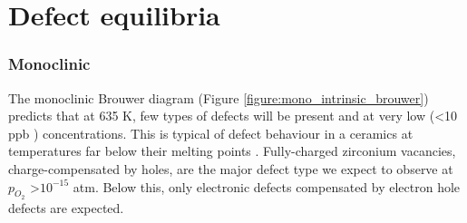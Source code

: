 \section{Defect equilibria} \label{brouwer_discussion_intrinsic}

\subsubsection*{Monoclinic}

The monoclinic Brouwer diagram (Figure \ref{figure:mono_intrinsic_brouwer}) predicts that at 635 K, few types of defects will be present and at very low (\textless 10 ppb \zirconia ) concentrations. This is typical of defect behaviour in a ceramics at temperatures far below their melting points \cite{kingery1997physical,ball2006computer}. Fully-charged zirconium vacancies, charge-compensated by holes, are the major defect type we expect to observe at $p_{O_{2}}$ \textgreater $10^{-15}$ atm. Below this, only electronic defects compensated by electron hole defects are expected. 


